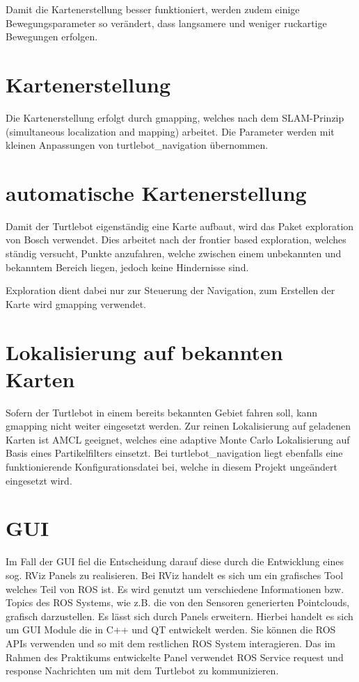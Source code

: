 Damit die Kartenerstellung besser funktioniert, werden zudem einige Bewegungsparameter so verändert, dass langsamere und weniger ruckartige Bewegungen erfolgen.

\section{Kartenerstellung}
Die Kartenerstellung erfolgt durch gmapping, welches nach dem SLAM-Prinzip (simultaneous localization and mapping) arbeitet. Die Parameter werden mit kleinen Anpassungen von turtlebot\_navigation übernommen.

\section{automatische Kartenerstellung}
Damit der Turtlebot eigenständig eine Karte aufbaut, wird das Paket exploration von Bosch verwendet. Dies arbeitet nach der frontier based exploration, welches ständig versucht, Punkte anzufahren, welche zwischen einem unbekannten und bekanntem Bereich liegen, jedoch keine Hindernisse sind.

Exploration dient dabei nur zur Steuerung der Navigation, zum Erstellen der Karte wird gmapping verwendet.

\section{Lokalisierung auf bekannten Karten}
Sofern der Turtlebot in einem bereits bekannten Gebiet fahren soll, kann gmapping nicht weiter eingesetzt werden. Zur reinen Lokalisierung auf geladenen Karten ist AMCL geeignet, welches eine adaptive Monte Carlo Lokalisierung auf Basis eines Partikelfilters einsetzt. Bei turtlebot\_navigation liegt ebenfalls eine funktionierende Konfigurationsdatei bei, welche in diesem Projekt ungeändert eingesetzt wird.

\section{GUI}
Im Fall der GUI fiel die Entscheidung darauf diese durch die Entwicklung eines sog. RViz Panels zu realisieren. Bei RViz handelt es sich um ein grafisches Tool welches Teil von ROS ist. Es wird genutzt um verschiedene Informationen bzw. Topics des ROS Systems, wie z.B. die von den Sensoren generierten Pointclouds, grafisch darzustellen. Es lässt sich durch Panels erweitern. Hierbei handelt es sich um GUI Module die in C++ und QT entwickelt werden. Sie können die ROS APIs verwenden und so mit dem restlichen ROS System interagieren. Das im Rahmen des Praktikums entwickelte Panel verwendet ROS Service request  und response Nachrichten um mit dem Turtlebot zu kommunizieren.